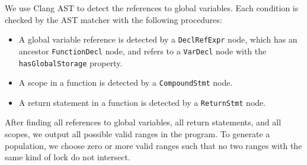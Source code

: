 We use Clang AST to detect the references to global variables. Each condition is checked by the AST matcher with the following procedures: \begin{itemize}
    \item A global variable reference is detected by a \verb|DeclRefExpr| node, which has an ancestor \verb|FunctionDecl| node, and refers to a \verb|VarDecl| node with the \verb|hasGlobalStorage| property.
    \item A scope in a function is detected by a \verb|CompoundStmt| node.
    \item A return statement in a function is detected by a \verb|ReturnStmt| node.
\end{itemize}

After finding all references to global variables, all return statements, and all scopes, we output all possible valid ranges in the program. To generate a population, we choose zero or more valid ranges such that no two ranges with the same kind of lock do not intersect.
